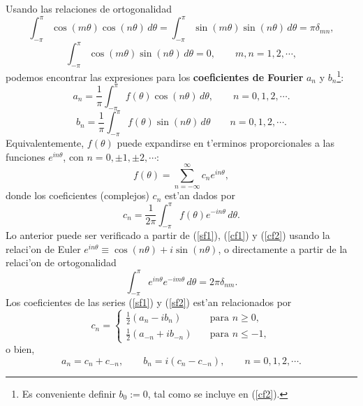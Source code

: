 Usando las relaciones de ortogonalidad 
\begin{equation}
\int_{-\pi}^\pi\cos(m\theta)\cos(n\theta)\,d\theta=\int_{-\pi}^\pi\sin(m\theta)\sin(n\theta)\,d\theta=\pi\delta_{mn},\label{eq:ortogo-sin-cos}
\end{equation}
\begin{equation}
\int_{-\pi}^\pi\cos(m\theta)\sin(n\theta)\,d\theta=0, \qquad m,n = 1,2,\cdots,
\end{equation}
podemos encontrar las expresiones para los \textbf{coeficientes de Fourier} $a_n$ y $b_n$\footnote{Es conveniente definir $b_0:=0$, tal como se incluye en (\ref{cf2}).}:
\begin{equation}\label{cf1}
a_n =\frac{1}{\pi}\int_{-\pi}^\pi f(\theta)\cos(n\theta)\,d\theta, \qquad n= 0, 1, 2,\cdots .
\end{equation}
\begin{equation}\label{cf2}
b_n =\frac{1}{\pi}\int_{-\pi}^\pi f(\theta)\sin(n\theta)\,d\theta  \qquad n= 0, 1, 2,\cdots .
\end{equation}
Equivalentemente, $f(\theta)$ puede expandirse en t'erminos proporcionales a las funciones $e^{i n\theta}$, con $n=0,\pm 1,\pm 2, \cdots$:
\begin{equation}\label{sf2}
f(\theta)=\sum_{n=-\infty}^\infty c_n e^{i n\theta},
\end{equation}
donde los coeficientes (complejos) $c_n$ est'an dados por
\begin{equation}
c_n =\frac{1}{2\pi}\int_{-\pi}^\pi f(\theta) e^{-in\theta}\,d\theta .
\end{equation}
Lo anterior puede ser verificado a partir de (\ref{sf1}), (\ref{cf1}) y (\ref{cf2}) usando la relaci'on de Euler $e^{in\theta}\equiv\cos(n\theta)+i\sin(n\theta)$, o directamente a partir de la relaci'on de ortogonalidad
\begin{equation}
\int_{-\pi}^\pi e^{i n\theta} e^{-i m \theta}\,d\theta =2\pi\delta_{nm}.
\end{equation}
Los coeficientes de las series (\ref{sf1}) y (\ref{sf2}) est'an relacionados por
\begin{equation}c_n = 
\begin{cases}
\frac{1}{2}(a_n - i b_n)\quad &\text{para } n\geq 0,\\
\frac{1}{2}(a_{-n} + i b_{-n})\quad &\text{para } n\leq -1,
\end{cases}
\end{equation} 
o bien,
\begin{equation}
a_n=c_n+c_{-n}, \qquad b_n=i(c_n-c_{-n}), \qquad n=0,1,2,\cdots .
\end{equation}

